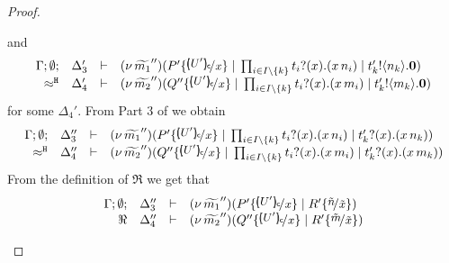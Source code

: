 \begin{proof}
\begin{enumerate}
\begin{enumerate}[i.]
							and
							\begin{eqnarray}
							\mhorel{\Gamma}{\Delta_3'}{  \newsp{\widetilde{m_1}''}{P' \subst{\omapchar{U'}}{x} \Par \prod_{i \in I\backslash{\set{k}}} \binp{t_i}{x} (\appl{x}{n_i}) \Par
									\bout{t'_k}{n_k} \inact}}
							{ \hwb }
							{\Delta_4'}{}{\newsp{\widetilde{m_2}''}{Q'' \subst{\omapchar{U'}}{x} \Par \prod_{i \in I\backslash{\set{k}}} \binp{t_i}{x} (\appl{x}{m_i}) \Par \bout{t'_k}{m_k} \inact}}
							\label{lem:tr_subst_41}
							\end{eqnarray}
							for some $\Delta_4'$.
							From Part 3 of  we obtain
							\begin{eqnarray}
								\mhorel{\Gamma}{\Delta_3''}{  \newsp{\widetilde{m_1}''}{P' \subst{\omapchar{U'}}{x} \Par \prod_{i \in I\backslash{\set{k}}} \binp{t_i}{x} (\appl{x}{n_i}) \Par
								\binp{t'_k}{x} (\appl{x}{n_k})}}
								{ \hwb }
								{\Delta_4''}{}{\newsp{\widetilde{m_2}''}{Q'' \subst{\omapchar{U'}}{x} \Par \prod_{i \in I\backslash{\set{k}}} \binp{t_i}{x} (\appl{x}{m_i}) \Par \binp{t'_k}{x} (\appl{x}{m_k})}}
								\label{lem:tr_subst_442}
							\end{eqnarray}
							From the definition of $\Re$ we get
							that
							\begin{eqnarray*}
							\mhorel{\Gamma}{\Delta_3''}{  \newsp{\widetilde{m_1}''}{P' \subst{\omapchar{U'}}{x} \Par R' \subst{\tilde{n}}{\tilde{x}}}}
							{ \Re }
							{\Delta_4''}{}{\newsp{\widetilde{m_2}''}{Q'' \subst{\omapchar{U'}}{x} \Par R' \subst{\tilde{m}}{\tilde{x}}}}
							\end{eqnarray*}

\end{enumerate}
\end{enumerate}
\end{proof}
